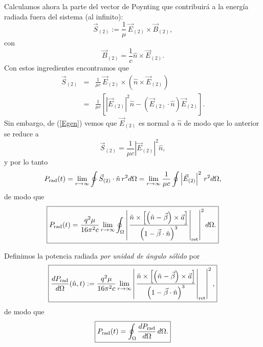 Calculamos ahora la parte del vector de Poynting que contribuirá a la energía
radiada fuera del sistema (al infinito):
\begin{equation}
 \vec{S}_{(2)}:=\frac{1}{\mu}\, \vec{E}_{(2)}\times\vec{B}_{(2)},
\end{equation}
con
\begin{equation}
\vec{B}_{(2)}= \frac{1}{c}\hat{n}\times\vec{E}_{(2)}.
\end{equation}
Con estos ingredientes encontramos que
\begin{eqnarray}
 \vec{S}_{(2)}&=&\frac{1}{\mu c}\, \vec{E}_{(2)}\times\left(
\hat{n}\times\vec{E}_{(2)}\right) \\
 &=& \frac{1}{\mu c}\left[ \left|\vec{E}_{(2)}\right|^2 \hat{n}-\left(
\vec{E}_{(2)}\cdot\hat{n}\right)  \vec{E}_{(2)}\right].
\end{eqnarray}
Sin embargo, de (\ref{Egen}) vemos que $\vec{E}_{(2)}$ es normal a $\hat{n}$ de
modo que lo anterior se reduce a
\begin{equation}\label{S2E}
 \boxed{\vec{S}_{(2)}= \frac{1}{\mu c} \left|\vec{E}_{(2)}\right|^2 \hat{n},}
\end{equation}
y por lo tanto
\begin{equation}
P_{\rm rad} (t)=\lim_{r\rightarrow\infty}\oint \vec{S}_{(2)}\cdot\hat{n}\,r^2 d\Omega = \lim_{r\rightarrow\infty}\frac{1}{\mu c}\oint \left|\vec{E}_{(2)}\right|^2\,r^2 d\Omega,
\end{equation}
de modo que
\begin{equation}
 \boxed{P_{\rm rad} (t)=\frac{q^2\mu}{16\pi^2c}\lim_{r\rightarrow\infty}\oint_\Omega
\left|\left.\frac{\hat{n}\times\left[ \left( \hat{n}-\vec{\beta}\right)
\times{\vec{a}}\right] }{\left( 1-\vec{\beta}\cdot\hat{n}\right)
^3}\right|_{\rm ret}\right|^2 d\Omega.}
\end{equation}

Definimos la potencia radiada \textit{por unidad de ángulo sólido}
por
\begin{equation}
 \boxed{\frac{dP_{\rm rad}}{d\Omega}(\hat{n},t):=\frac{q^2\mu}{16\pi^2c}\lim_{r\rightarrow\infty} \left|\left.
\frac{\hat{n}\times\left[ \left( \hat{n}-\vec{\beta}\right)
\times{\vec{a}}\right] }{\left( 1-\vec{\beta}\cdot\hat{n}\right)
^3}\right|_{\rm ret}\right|^2 ,} \label{dPdO}
\end{equation}
de modo que
\begin{equation}
 \boxed{P_{\rm rad}(t)=\oint_\Omega \frac{dP_{\rm rad}}{d\Omega}\,d\Omega.}
\end{equation}


